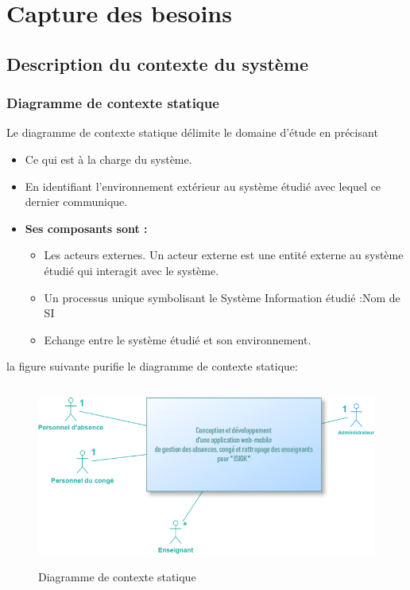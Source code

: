 \documentclass[12 pt ]{report}
\begin{document}
\section{Capture des besoins}
\subsection{Description du contexte du système}
\subsubsection{Diagramme de contexte statique}


Le diagramme de contexte statique délimite le domaine d’étude en précisant 
\begin{itemize}[font=\color{black} \Large, label=]

	\item Ce qui est à la charge du système.
	\item En identifiant l’environnement extérieur au système étudié avec lequel ce dernier communique. 
\end{itemize}
\newpage
\begin{itemize}[font=\color{black} \Large, label=]
\item \textbf{Ses composants sont : }
\begin{itemize}[font=\color{black} \Large, label=]
\item Les acteurs externes. Un acteur externe est une entité externe au système étudié qui interagit avec le système. 
\item  Un processus unique symbolisant le Système Information étudié :Nom de SI
\item Echange entre le système étudié et son environnement.
\end{itemize}

\end{itemize}


la figure suivante purifie le diagramme de contexte statique:
\begin{center}
\begin{figure}[h]
\includegraphics[width= 17 cm ,height= 6cm]{c.png}
\caption{ Diagramme de contexte statique}
\end{figure}
\end{center}
\end{document}
